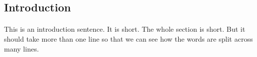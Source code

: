 

\subsection{Introduction}
\paragraph{}
This is an introduction sentence. It is short. The whole section is short. But it should take more than one line so that we can see how the words are split across many lines.
